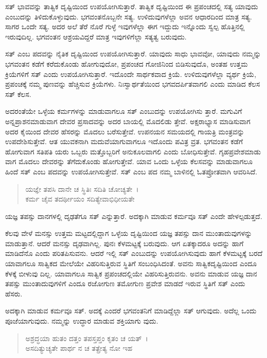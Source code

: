 ಸತ್ ಭಾವವನ್ನು ತಾತ್ವಿಕ ದೃಷ್ಟಿಯಿಂದ ಉಪಯೋಗಿಸುತ್ತಾರೆ. ತಾತ್ವಿಕ ದೃಷ್ಟಿಯಿಂದ ಈ ಪ್ರಪಂಚದಲ್ಲಿ ಸತ್ಯ ಯಾವುದು ಎಂಬುದನ್ನು ತಿಳಿದುಕೊಳ್ಳುವುದು. ಭಗವಂತನೊಬ್ಬನೇ ಸತ್ಯ. ಉಳಿದುವುಗಳೆಲ್ಲಾ ಅವನ ಆಧಾರದಿಂದ ಮಾತ್ರ ಸತ್ಯ. ಸಾಗರ ಒಂದೇ ಸತ್ಯ. ಅದರ ಅಲೆ ತೆರೆ ನೊರೆ ಗುಳ್ಳೆ ಇವುಗಳೆಲ್ಲಾ ಈಗ ಇದ್ದುದು ಇನ್ನೊಂದು ಸ್ವಲ್ಪ ಹೊತ್ತಿನಲ್ಲಿ ಇರುವುದಿಲ್ಲ. ಭಗವಂತನ ಆಶ್ರಯವಿದ್ದರೆ ಮಾತ್ರ ಇವುಗಳಿಗೆಲ್ಲಾ ಸತ್ಯತ್ವ ಬರುವುದು.

ಸತ್ ಎಂಬ ಪದವನ್ನು ನೈತಿಕ ದೃಷ್ಟಿಯಿಂದ ಉಪಯೋಗಿಸುತ್ತಾರೆ. ಯಾವುದು ಸಾಧು ಭಾವವೋ, ಯಾವುದು ನಮ್ಮನ್ನು ಭಗವಂತನ ಕಡೆಗೆ ಕರೆದುಕೊಂಡು ಹೋಗುವುದೋ, ಪ್ರಪಂಚದ ಗೋಜಿನಿಂದ ಬಿಡಿಸುವುದೊ, ಅಂತಹ ಉತ್ತಮ ಕ್ರಿಯೆಗಳಿಗೆ ಸತ್ ಎಂದು ಉಪಯೋಗಿಸುತ್ತಾರೆ. ಇದೊಂದೇ ಸಾರ್ಥಕವಾದ ಕ್ರಿಯೆ. ಉಳಿದುವುಗಳೆಲ್ಲಾ ವ್ಯರ್ಥ ಕ್ರಿಯೆ, ಪ್ರಪಂಚಕ್ಕೆ ನಮ್ಮ ಪುಣವನ್ನು ಹೆಚ್ಚಿಸುವ ಕ್ರಿಯೆಗಳು. ನಿಃಸ್ವಾರ್ಥತೆಯಿಂದ ಭಗವದರ್ಪಿತವಾಗಲಿ ಎಂದು ಮಾಡಿದ ಕೆಲಸ ಸತ್ ಕೆಲಸ.

ಅದರಂತೆಯೇ ಒಳ್ಳೆಯ ಕರ್ಮಗಳನ್ನು ಮಾಡುವಾಗಲೂ ಸತ್ ಎಂಬುದನ್ನು ಉಪಯೋಗಿಸು ತ್ತಾರೆ. ಮಗುವಿಗೆ ಅನ್ನಪ್ರಾಶನಮಾಡುವಾಗ ದೇವರ ಪ್ರಸಾದವನ್ನು ಅದರ ಬಾಯಲ್ಲಿ ಮೊದಲಿಡು ತ್ತೇವೆ. ಅಕ್ಷರಾಭ್ಯಾಸ ಮಾಡಿಸುವಾಗ ಅದರ ಕೈಯಿಂದ ದೇವರ ಹೆಸರನ್ನು ಮೊದಲು ಬರೆಸುತ್ತೇವೆ. ಉಪನಯನ ಸಮಯದಲ್ಲಿ ಗಾಯತ್ರಿ ಮಂತ್ರವನ್ನು ಉಪದೇಶಿಸುತ್ತೇವೆ. ಆತ ಯುವಕನಾಗಿ ಮದುವೆಯಾಗುವಾಗಲೂ ಇದೊಂದು ಪವಿತ್ರ ವ್ರತ. ಭಗವಂತನ ಕಡೆಗೆ ಹೋಗುವಾಗ ಸತಿಪತಿ ಯರು ಒಬ್ಬರು ಮತ್ತೊಬ್ಬರಿಗೆ ಅನುಕೂಲವಾಗಲಿ ಎಂದು ಬೋಧಿಸುತ್ತೇವೆ. ಗೃಹಪ್ರವೇಶಮಾಡು ವಾಗ ಮೊದಲು ದೇವರನ್ನು ತೆಗೆದುಕೊಂಡು ಹೋಗುತ್ತೇವೆ. ಯಾವ ಒಂದು ಒಳ್ಳೆಯ ಕೆಲಸವನ್ನು ಮಾಡುವಾಗಲೂ ಹಿಂದೆ ಸತ್ ಎಂಬ ಪದವನ್ನು ಉಪಯೋಗಿಸುತ್ತೇವೆ. ಸತ್ ಎಂಬ ಪದ ನಮ್ಮ ಬಾಳಿನಲ್ಲಿ ಓತಪ್ರೋತವಾಗಿ ಆವರಿಸಿದೆ.

\begin{verse}
ಯಜ್ಞೇ ತಪಸಿ ದಾನೇ ಚ ಸ್ಥಿತಿಃ ಸದಿತಿ ಚೋಚ್ಯತೇ~।\\ಕರ್ಮ ಚೈವ ತದರ್ಥೀಯಂ ಸದಿತ್ಯೇವಾಭಿಧೀಯತೇ 
\end{verse}

{\small ಯಜ್ಞ ತಪಸ್ಸು ದಾನಗಳಲ್ಲಿ ದೃಢತೆಗೂ ಸತ್ ಎನ್ನುತ್ತಾರೆ. ಅದಕ್ಕಾಗಿ ಮಾಡುವ ಕರ್ಮವೂ ಸತ್ ಎಂದೇ ಹೇಳಲ್ಪಡುತ್ತದೆ.}

ಕೆಲವು ವೇಳೆ ಮನಸ್ಸು ಉತ್ತಮ ಮಟ್ಟದಲ್ಲಿದ್ದಾಗ ಒಳ್ಳೆಯ ದೃಷ್ಟಿಯಿಂದ ಯಜ್ಞ ತಪಸ್ಸು ದಾನ ಮುಂತಾದುವುಗಳನ್ನು ಮಾಡುತ್ತಾನೆ. ಆದರೆ ಮನಸ್ಸು ದೃಢವಾಗಿಲ್ಲ. ಪುನಃ ಕೆಳಮಟ್ಟಕ್ಕೆ ಬರುವುದು. ಆಗ ಏತಕ್ಕಾದರೂ ಅದನ್ನು ಹಾಗೆ ಮಾಡಿದೆನೊ ಎಂದು ಪರಿತಪಿಸುವನು. ಆದರೆ ಇಲ್ಲಿ ಸತ್ ಎಂಬುದನ್ನು ಉಪಯೋಗಿಸುವುದು ಹಾಗೆ ಕೆಳಮಟ್ಟಕ್ಕೆ ಬರದೆ ಯಾವಾಗಲೂ ಸಾತ್ವಿಕದ ಮೇಲೆಯೇ ವಿಹರಿಸುತ್ತಿರುವ ಸ್ಥಿತಿಗೆ ಸಂಬಂಧಿಸಿದಂತೆ. ಅವನು ಸಾತ್ವಿಕದೃಷ್ಟಿಯಿಂದ ಎಂದೂ ಕೆಳಕ್ಕೆ ಬೀಳುವು ದಿಲ್ಲ. ಯಾವಾಗಲೂ ಸಾತ್ವಿಕ ಪ್ರಪಂಚದಲ್ಲಿಯೇ ವಿಹರಿಸುತ್ತಿರುವನು. ಅವನು ಮಾಡುವ ಯಜ್ಞ ದಾನ ತಪಸ್ಸು ಮುಂತಾದುವುಗಳಿಗೆ ಎಂದೂ ರಜೋಗುಣ ತಮೋಗುಣ ಪ್ರವೇಶ ಮಾಡದೆ ಇರುವ ಸ್ಥಿತಿಗೆ ಸತ್ ಎಂದು ಹೆಸರು.

ಅದಕ್ಕಾಗಿ ಮಾಡುವ ಕರ್ಮವೂ ಸತ್. ಅದಕ್ಕೆ ಎಂದರೆ ಭಗವಂತನಿಗೆ ಮಾಡಿದ್ದೆಲ್ಲಾ ಸತ್ ಆಗುವುದು. ಅದೆಲ್ಲ ಒಂದು ಪೂಜೆಯಾಗುವುದು. ನಮ್ಮನ್ನು ಉದ್ಧಾರ ಮಾಡುವ ಶಕ್ತಿಯಾಗು ವುದು.

\begin{verse}
ಅಶ್ರದ್ಧಯಾ ಹುತಂ ದತ್ತಂ ತಪಸ್ತಪ್ತಂ ಕೃತಂ ಚ ಯತ್~।\\ಅಸದಿತ್ಯುಚ್ಯತೇ ಪಾರ್ಥ ನ ಚ ತತ್ಪ್ರೇತ್ಯ ನೋ ಇಹ 
\end{verse}

